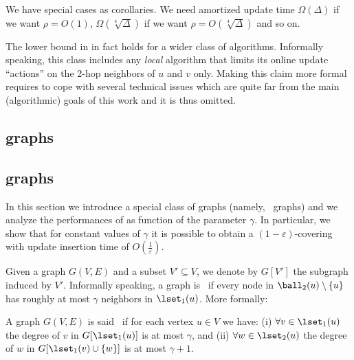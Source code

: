 We have special cases as corollaries. We need amortized update time $\Omega(\Delta)$ if we want $\rho = O(1)$, $\Omega(\sqrt[4]{\Delta})$ if we want $\rho = O(\sqrt[4]{\Delta})$ and so on. 

\begin{remark}
    The  lower bound in    in fact holds for a wider class of algorithms. Informally speaking, this class includes any \textit{local} algorithm that limits its online update ``actions''  on the 2-hop neighbors   of $u$ and $v$ only. Making this claim more formal requires to cope with several technical issues which are quite far from the main (algorithmic) goals of this work and it is thus omitted.
    \end{remark}




\subsection{\texorpdfstring{\gammaok} \ graphs} \label{ssec:gammaok}
\subsection{\texorpdfstring{\gammaok} \ graphs} \label{ssec:gammaok}
In this section we introduce a special class of graphs (namely, \gammaok\ graphs) and we analyze the performances of  as function of the parameter $\gamma$. In particular, we show that for constant values of $\gamma$ it is possible to obtain a $(1-\varepsilon)$-covering with update insertion time of $O(\frac{1}{\varepsilon})$.

Given a graph $G(V,E)$ and a subset $V' \subseteq V$, we denote by $G[V']$ the subgraph induced by $V'$. Informally speaking, a graph is \gammaok\ if every node in $\ball_2(u) \setminus \{u\}$ has roughly at most $\gamma$ neighbors in $\lset_1(u)$. More formally:

\begin{definition} \label{def:gammaok}
    A graph $G(V,E)$ is said \gammaok\ if for each vertex $u \in V$ we have:
    (i)   $\forall v \in \lset_1(u)$ the degree of $v$ in $G[\lset_1(u)]$ is at most $\gamma$, and (ii) 
          $\forall w \in \lset_2(u)$ the degree of $w$ in $G[\lset_1(v) \cup \{ w \}]$ is at most $\gamma+1$.
\end{definition}

